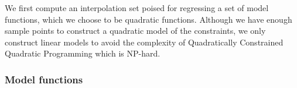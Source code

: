 \documentclass{article}
\DeclareMathOperator*{\argmin}{arg\,min}
\let\oldref\ref
\renewcommand{\ref}[1]{(\oldref{#1})}
\begin{document}

We first compute an interpolation set poised for regressing a set of model functions, which we choose to be quadratic functions.
Although we have enough sample points to construct a quadratic model of the constraints, we only construct linear models to avoid the complexity of Quadratically Constrained Quadratic Programming which is NP-hard.

\subsubsection{Model functions}




\end{document}
